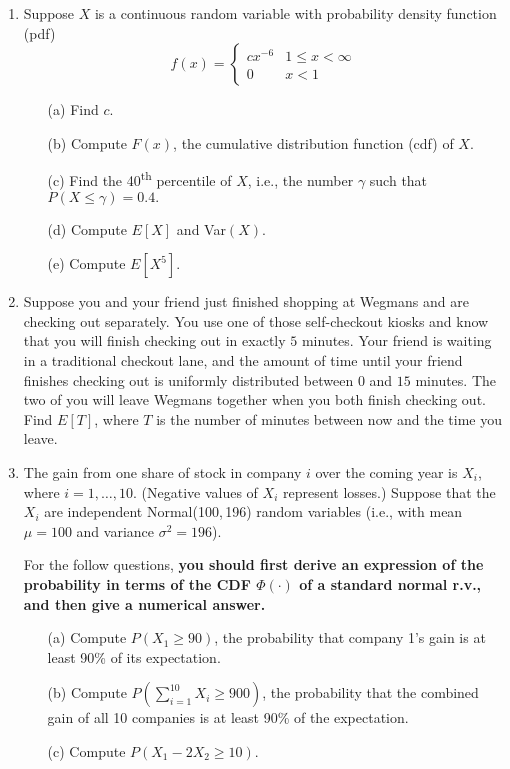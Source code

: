 \documentclass{article}    %
\begin{document}
\begin{enumerate}
\item Suppose $X$ is a continuous random variable with probability density function (pdf)
$$
    f(x) = \begin{cases} cx^{-6} & 1 \leq x < \infty \\ 0 & x < 1 \end{cases}
$$
\begin{enumerate}
\item[(a)] Find $c$. \\ 
\item[(b)] Compute $F(x)$, the cumulative distribution function (cdf) of $X$. \\ 
\item[(c)] Find the 40\textsuperscript{th} percentile of $X$, i.e., the number $\gamma$ such that $P(X \leq \gamma) = 0.4.$ \\ 
\item[(d)] Compute $E[X]$ and Var$(X)$. \\ 
\item[(e)] Compute $E[X^5]$. \\ 
\end{enumerate}

\item Suppose you and your friend just finished shopping at Wegmans and are checking out separately. You use one of those self-checkout kiosks and know that you will finish checking out in exactly $ 5 $ minutes. Your friend is waiting in a traditional checkout lane, and the amount of time until your friend finishes checking out is uniformly distributed between $ 0 $ and $ 15 $ minutes. The two of you will leave Wegmans together when you both finish checking out. Find $E[T]$, where $ T $ is the number of minutes between now and the time you leave. \\

\item The gain from one share of stock in company $ i $ over the coming year is $X_i$,  where $i = 1, \ldots, 10$. (Negative values of $ X_i $ represent losses.) Suppose that the $X_i$ are independent Normal(100,\,196) random variables (i.e., with mean $\mu = 100$ and variance $\sigma^2 = 196$). 

For the follow questions, \textbf{you should first derive an expression of the probability in terms of the CDF $ \Phi(\cdot) $ of a standard normal r.v., and then give a numerical answer.}
\begin{enumerate}
\item[(a)] Compute $P(X_1 \ge 90)$, the probability that company 1's gain is at least 90\% of its expectation. \\
\item[(b)] Compute $P(\sum_{i=1}^{10} X_i \ge  900)$, the probability that the combined gain of all 10 companies is at least 90\% of the expectation. \\
\item[(c)] Compute $P(X_1 - 2X_2 \geq 10)$. \\
\end{enumerate}


\end{enumerate}
\end{document}
